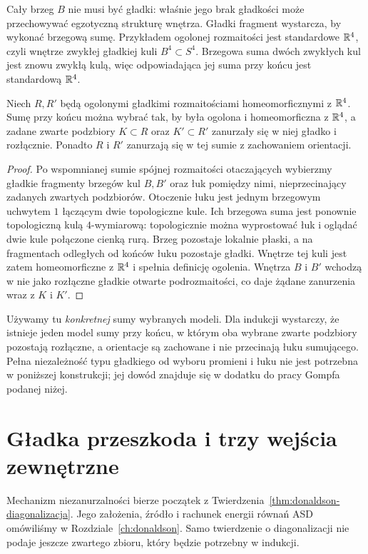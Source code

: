 Cały brzeg $B$ nie musi być gładki: właśnie jego
brak gładkości może przechowywać egzotyczną
strukturę wnętrza. Gładki fragment wystarcza,
by wykonać brzegową sumę. Przykładem ogolonej
rozmaitości jest standardowe $\mathbb{R}^4$, czyli
wnętrze zwykłej gładkiej kuli $B^4\subset S^4$.
Brzegowa suma dwóch zwykłych kul jest znowu
zwykłą kulą, więc odpowiadająca jej suma przy
końcu jest standardową $\mathbb{R}^4$.

\begin{stwierdzenie}
\label{prop:egzotyczne-r4-suma}
Niech $R,R'$ będą ogolonymi gładkimi rozmaitościami
homeomorficznymi z $\mathbb{R}^4$. Sumę przy końcu można
wybrać tak, by była ogolona i homeomorficzna z
$\mathbb{R}^4$, a zadane zwarte podzbiory $K\subset R$ oraz
$K'\subset R'$ zanurzały się w niej gładko i
rozłącznie. Ponadto $R$ i $R'$ zanurzają się w
tej sumie z zachowaniem orientacji.
\end{stwierdzenie}
\begin{proof}
Po wspomnianej sumie spójnej rozmaitości otaczających
wybierzmy gładkie fragmenty brzegów kul $B,B'$
oraz łuk pomiędzy nimi, nieprzecinający zadanych
zwartych podzbiorów. Otoczenie łuku jest
jednym brzegowym uchwytem $1$ łączącym dwie
topologiczne kule. Ich brzegowa suma jest ponownie
topologiczną kulą $4$-wymiarową: topologicznie
można wyprostować łuk i oglądać dwie kule
połączone cienką rurą. Brzeg pozostaje lokalnie
płaski, a na fragmentach odległych od końców
łuku pozostaje gładki. Wnętrze tej kuli jest
zatem homeomorficzne z $\mathbb{R}^4$ i spełnia definicję
ogolenia. Wnętrza $B$ i $B'$ wchodzą w nie jako
rozłączne gładkie otwarte podrozmaitości, co daje
żądane zanurzenia wraz z $K$ i $K'$.
\end{proof}

Używamy tu \emph{konkretnej} sumy wybranych
modeli. Dla indukcji wystarczy, że istnieje
jeden model sumy przy końcu, w którym oba
wybrane zwarte podzbiory pozostają rozłączne,
a orientacje są zachowane i nie przecinają łuku
sumującego. Pełna niezależność typu gładkiego
od wyboru promieni i łuku nie jest potrzebna
w poniższej konstrukcji; jej dowód znajduje się
w dodatku do pracy Gompfa podanej niżej.

\section{Gładka przeszkoda i trzy wejścia zewnętrzne}
\label{sec:egzotyczne-r4-wejscia}

Mechanizm niezanurzalności bierze początek z
Twierdzenia~\ref{thm:donaldson-diagonalizacja}.
Jego założenia, źródło i rachunek energii równań ASD
omówiliśmy w Rozdziale~\ref{ch:donaldson}.
Samo twierdzenie o
diagonalizacji nie podaje jeszcze zwartego zbioru,
który będzie potrzebny w indukcji.

